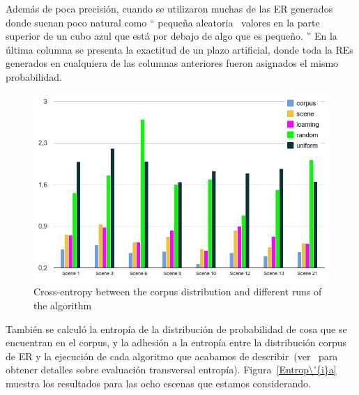 Adem\'as de poca precisi\'on, cuando se utilizaron muchas de las ER generados donde suenan poco natural como `` peque\~na aleatoria \ \puse valores
en la parte superior de un cubo azul que est\'a por debajo de algo que es peque\~no. '' En la \'ultima columna se presenta la exactitud de un plazo artificial, donde toda la
REs generados en cualquiera de las columnas anteriores fueron asignados el mismo
probabilidad.


\begin{figure}
\begin{center}
\vspace*{-1cm}
\hspace*{-.3cm}\includegraphics[width=.55\textwidth]{images/entropy.jpg}
\end{center}
\vspace*{-.5cm}
\caption{Cross-entropy between the corpus distribution and different runs of the algorithm}\label{Entropy}
\end{figure}


%

Tambi\'en se calcul\'o la entrop\'{i}a de la distribuci\'on de probabilidad de cosa que se encuentran en el corpus, y la adhesi\'on a la entrop\'{i}a entre la distribuci\'on corpus de ER y la ejecuci\'on de cada algoritmo que acabamos de describir~(ver~\cite{juraksky:spee08} para obtener detalles sobre evaluaci\'on transversal entrop\'{i}a). Figura~\ref{Entrop\'{i}a} muestra los resultados para las ocho escenas que estamos considerando.

%
%

